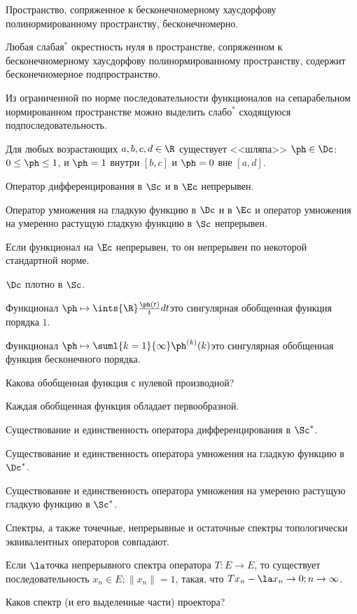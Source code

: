 \documentclass[a4paper]{article}
\begin{document}
\begin{nums}{-1}
\item  Пространство, сопряженное к бесконечномерному хаусдорфову полинормированному
пространству, бесконечномерно.
\item Любая слабая$^*$ окрестность нуля в пространстве, сопряженном к
бесконечномерному хаусдорфову полинормированному пространству, содержит бесконечномерное
подпространство.

\item Из ограниченной по норме последовательности функционалов на сепарабельном нормированном
пространстве можно выделить слабо$^*$ сходящуюся подпоследовательность.
\item Для любых возрастающих $a,b,c,d\in \R$ существует <<шляпа>> $\ph \in\Dc$:
$0\le\ph\le 1$, и $\ph=1$ внутри $[b,c]$ и $\ph=0$ вне $[a,d]$.

\item Оператор дифференцирования в $\Sc$ и в $\Ec$ непрерывен.
\item Оператор умножения на гладкую функцию в $\Dc$ и в $\Ec$ и оператор умножения на
умеренно растущую гладкую функцию в $\Sc$ непрерывен.
\item Если функционал на $\Ec$ непрерывен, то он непрерывен по некоторой стандартной норме.
\item $\Dc$ плотно в $\Sc$.
\item Функционал $\ph\mapsto\ints{\R}\frac{\ph(t)}{t}dt$\т это сингулярная обобщенная функция порядка $1$.
\item Функционал $\ph\mapsto\suml{k=1}{\infty}\ph^{(k)}(k)$\т это сингулярная обобщенная
функция бесконечного порядка.
\item Какова обобщенная функция с нулевой производной?
\item Каждая обобщенная функция обладает первообразной.
\item Существование и единственность оператора дифференцирования в $\Sc^*$.
\item Существование и единственность оператора умножения на гладкую функцию в $\Dc^*$.
\item Существование и единственность оператора умножения на умеренно растущую гладкую функцию в $\Sc^*$.
\item Спектры, а также точечные, непрерывные и остаточные спектры топологически эквивалентных операторов совпадают.
\item Если $\la$\т точка непрерывного спектра оператора $T:E\to E$, то существует
последовательность $x_n\in E;\|x_n\|=1$, такая, что $Tx_n-\la x_n\to0; n\to\infty$.
\item Каков спектр (и его выделенные части) проектора?

\end{nums}
\end{document}
